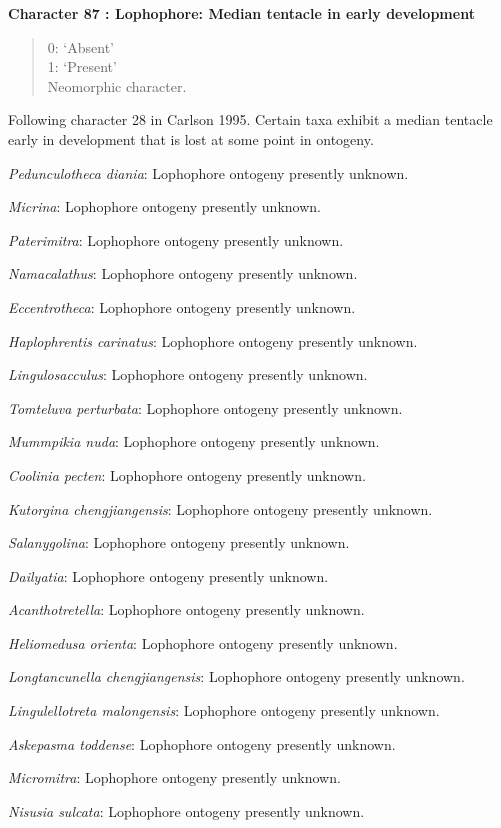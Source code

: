 \documentclass[]{book}
\theoremstyle{definition}
\theoremstyle{definition}
\theoremstyle{definition}
\theoremstyle{remark}
\begin{document}
\textbf{Character 87 : Lophophore: Median tentacle in early development
}

\begin{quote}
0: `Absent'\\
1: `Present'\\
Neomorphic character.
\end{quote}

Following character 28 in Carlson 1995. Certain taxa exhibit a median
tentacle early in development that is lost at some point in ontogeny.

\emph{Pedunculotheca diania}: Lophophore ontogeny presently unknown.

\emph{Micrina}: Lophophore ontogeny presently unknown.

\emph{Paterimitra}: Lophophore ontogeny presently unknown.

\emph{Namacalathus}: Lophophore ontogeny presently unknown.

\emph{Eccentrotheca}: Lophophore ontogeny presently unknown.

\emph{Haplophrentis carinatus}: Lophophore ontogeny presently unknown.

\emph{Lingulosacculus}: Lophophore ontogeny presently unknown.

\emph{Tomteluva perturbata}: Lophophore ontogeny presently unknown.

\emph{Mummpikia nuda}: Lophophore ontogeny presently unknown.

\emph{Coolinia pecten}: Lophophore ontogeny presently unknown.

\emph{Kutorgina chengjiangensis}: Lophophore ontogeny presently unknown.

\emph{Salanygolina}: Lophophore ontogeny presently unknown.

\emph{Dailyatia}: Lophophore ontogeny presently unknown.

\emph{Acanthotretella}: Lophophore ontogeny presently unknown.

\emph{Heliomedusa orienta}: Lophophore ontogeny presently unknown.

\emph{Longtancunella chengjiangensis}: Lophophore ontogeny presently
unknown.

\emph{Lingulellotreta malongensis}: Lophophore ontogeny presently
unknown.

\emph{Askepasma toddense}: Lophophore ontogeny presently unknown.

\emph{Micromitra}: Lophophore ontogeny presently unknown.

\emph{Nisusia sulcata}: Lophophore ontogeny presently unknown.
\end{document}
